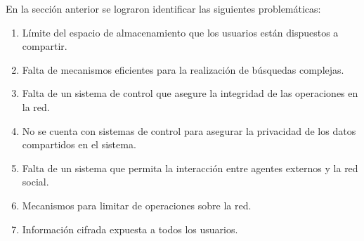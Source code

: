 En la sección anterior se lograron identificar las siguientes problemáticas:
\begin{enumerate}
    \item Límite del espacio de almacenamiento que los usuarios están dispuestos a compartir.
    \item Falta de mecanismos eficientes para la realización de búsquedas complejas.
    \item Falta de un sistema de control que asegure la integridad de las operaciones en la red.
    \item No se cuenta con sistemas de control para asegurar la privacidad de los datos compartidos en el sistema.
    \item Falta de un sistema que permita la interacción entre agentes externos y la red social.
    \item Mecanismos para limitar de operaciones sobre la red.

    \item Información cifrada expuesta a todos los usuarios.


\end{enumerate}
